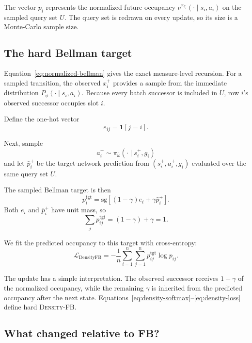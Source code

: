 \documentclass{article}
\newcommand{\ind}[1]{\mathbf{1}\!\left[#1\right]}
\newcommand{\sg}{\mathrm{sg}}
\newcommand{\DensityFB}{\textsc{Density-FB}}
\begin{document}
The vector $p_i$ represents the normalized future occupancy
$\nu^{\pi_{g_i}}(\cdot\mid s_i,a_i)$ on the sampled query set $U$.
The query set is redrawn on every update, so its size is a Monte-Carlo sample size.

\subsection{The hard Bellman target}

Equation~\ref{eq:normalized-bellman} gives the exact measure-level recursion.
For a sampled transition, the observed $x_i^+$ provides a sample from the immediate distribution $P_\phi(\cdot\mid s_i,a_i)$.
Because every batch successor is included in $U$, row $i$'s observed successor occupies slot $i$.

Define the one-hot vector
\begin{equation}
    e_{ij} = \ind{j=i}.
\end{equation}

Next, sample
\begin{equation}
a_i^+
\sim
\pi_{\bar\omega}(\cdot\mid s_i^+,g_i)
\end{equation}
and let $\bar p_i^+$ be the target-network prediction from $(s_i^+,a_i^+,g_i)$ evaluated over the same query set $U$.

The sampled Bellman target is then
\begin{equation}
\label{eq:hard-target}
    p_i^{\mathrm{tgt}} = \sg\left[ (1-\gamma)e_i + \gamma\bar p_i^+ \right].
\end{equation}
Both $e_i$ and $\bar p_i^+$ have unit mass, so
\begin{equation}
    \sum_j p_{ij}^{\mathrm{tgt}} = (1-\gamma)+\gamma = 1.
\end{equation}

We fit the predicted occupancy to this target with cross-entropy:
\begin{equation}
\label{eq:density-loss}
\mathcal L_{\mathrm{DensityFB}} = - \frac1n \sum_{i=1}^n \sum_{j=1}^n p_{ij}^{\mathrm{tgt}} \log p_{ij}.
\end{equation}

The update has a simple interpretation.
The observed successor receives $1-\gamma$ of the normalized occupancy, while the remaining $\gamma$ is inherited from the predicted occupancy after the next state.
Equations~\ref{eq:density-softmax}--\ref{eq:density-loss} define hard \DensityFB{}.

\subsection{What changed relative to FB?}
\end{document}
